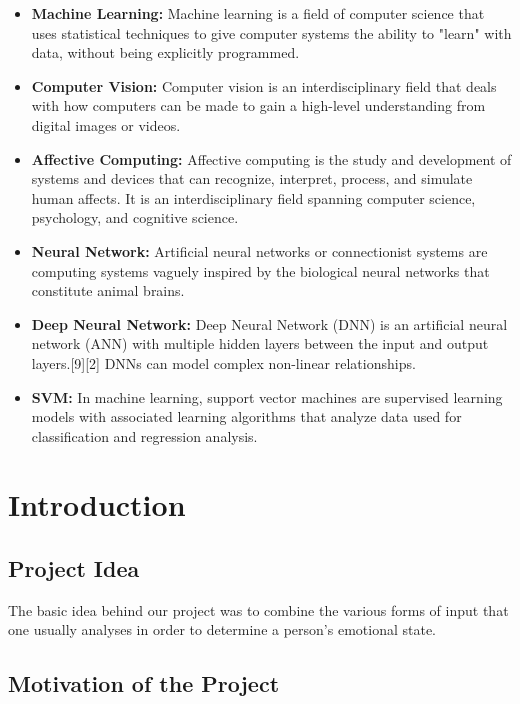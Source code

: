 \documentclass[oneside,a4paper,12pt]{report}
\begin{document}
\begin{normalsize}
 \begin{itemize}
   \item 	\textbf{Machine Learning: } Machine learning is a field of computer science that uses statistical techniques to give computer systems the ability to "learn" with data, without being explicitly programmed.
 \item \textbf{Computer Vision: } Computer vision is an interdisciplinary field that deals with how computers can be made to gain a high-level understanding from digital images or videos.
 \item	\textbf{Affective Computing: } Affective computing is the study and development of systems and devices that can recognize, interpret, process, and simulate human affects. It is an interdisciplinary field spanning computer science, psychology, and cognitive science.
 \item \textbf{Neural Network: } Artificial neural networks or connectionist systems are computing systems vaguely inspired by the biological neural networks that constitute animal brains.
 
 \item \textbf{Deep Neural Network: } Deep Neural Network (DNN) is an artificial neural network (ANN) with multiple hidden layers between the input and output layers.[9][2] DNNs can model complex non-linear relationships.
 
 
 \item \textbf{SVM: } In machine learning, support vector machines are supervised learning models with associated learning algorithms that analyze data used for classification and regression analysis.
 
 \end{itemize}

\chapter{Introduction}
\section{Project Idea}
 The basic idea behind our project was to combine the various forms of input that one usually analyses in order to determine a person's emotional state.

\vspace{\baselineskip}
\section{Motivation of the Project}  
\begin{itemize}
	

\end{itemize}
\end{normalsize}
\end{document}
